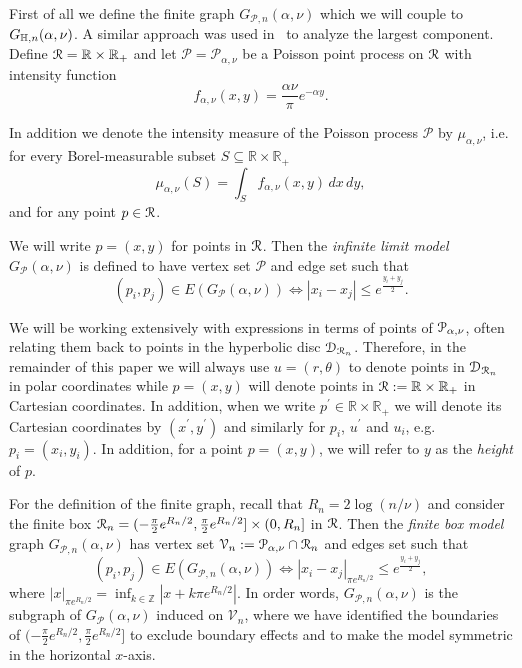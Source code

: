 First of all we define the finite graph $G_{\mathcal{P},n}(\alpha, \nu)$ which we will couple to $G_{\mathbb{H}, n}(\alpha, \nu)$. A similar approach was used in~\cite{fountoulakis2018law} to analyze the largest component. Define ${\mathcal R} = \mathbb{R} \times \mathbb{R}_+$ and let $\mathcal{P}=\mathcal{P}_{\alpha,\nu}$ be a Poisson point process on ${\mathcal R}$ with intensity function
\begin{equation}\label{eq:def_intensity_function_f}
	f_{\alpha,\nu}(x,y) = \frac{\alpha \nu}{\pi} e^{-\alpha y}.
\end{equation} 

In addition we denote the intensity measure of the Poisson process $\mathcal{P}$ by $\mu_{\alpha, \nu}$, i.e. for every Borel-measurable subset $S \subseteq \mathbb{R} \times \mathbb{R}_+$
\begin{equation}\label{eq:def_mu_P}
	\mu_{\alpha,\nu}(S) = \int_S f_{\alpha,\nu}(x,y) \, dx \, dy,
\end{equation}
and for any point $p \in {\mathcal R}$.

We will write $p = (x, y)$ for points in ${\mathcal R}$. Then the \emph{infinite limit model} $G_{\mathcal{P}}(\alpha, \nu)$ is defined to have vertex set $\mathcal{P}$ and edge set such that
\[
	(p_i, p_j) \in E(G_{\mathcal{P}}(\alpha, \nu)) \iff |x_i - x_j| \leq e^{\frac{y_i + y_j}{2}}.
\]

\begin{remark}\label{rmk:point_notation}
We will be working extensively with expressions in terms of points of ${\mathcal P}_{\alpha, \nu}$, often relating them back to points in the hyperbolic disc ${\mathcal D}_{{\mathcal R}_n}$. Therefore, in the remainder of this paper we will always use $u = (r,\theta)$ to denote points in ${\mathcal D}_{{\mathcal R}_n}$ in polar coordinates while $p = (x,y)$ will denote points in ${\mathcal R} := \mathbb{R} \times \mathbb{R}_+$ in Cartesian coordinates. In addition, when we write $p^\prime \in \mathbb{R} \times \mathbb{R}_+$ we will denote its Cartesian coordinates by $(x^\prime, y^\prime)$ and similarly for $p_i$, $u^\prime$ and $u_i$, e.g. $p_i = (x_i, y_i)$. In addition, for a point $p = (x,y)$, we will refer to $y$ as the \emph{height} of $p$.
\end{remark}

For the definition of the finite graph, recall that $R_n = 2\log(n/\nu)$ and consider the finite box ${\mathcal R}_n = (-\frac{\pi}{2}e^{R_n/2}, \frac{\pi}{2}e^{R_n/2}] \times (0, R_n]$ in ${\mathcal R}$. Then the \emph{finite box model} graph $G_{\mathcal{P},n}(\alpha, \nu)$ has vertex set $\mathcal{V}_n := \mathcal{P}_{\alpha, \nu} \cap {\mathcal R}_n$ and edges set such that
\[
	(p_i, p_j) \in E(G_{\mathcal{P},n}(\alpha, \nu)) \iff |x_i - x_j|_{\pi e^{R_n/2}} \leq e^{\frac{y_i + y_j}{2}},
\]
where $|x|_{\pi e^{R_n/2}} = \inf_{k \in \mathbb{Z}} |x + k \pi e^{R_n/2}|$. In order words, $G_{\mathcal{P},n}(\alpha, \nu)$ is the subgraph of $G_{\mathcal{P}}(\alpha, \nu)$ induced on $\mathcal{V}_n$, where we have identified the boundaries of $(-\frac{\pi}{2}e^{R_n/2}, \frac{\pi}{2}e^{R_n/2}]$ to exclude boundary effects and to make the model symmetric in the horizontal $x$-axis. 

